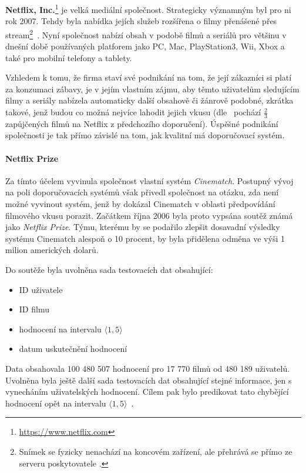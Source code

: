 \documentclass[thesis=M,czech]{FITthesis}[2014/05/07]
\begin{document}
\textbf{Netflix, Inc.}\footnote{\url{https://www.netflix.com}} je velká mediální společnost. Strategicky významným byl pro ni rok 2007. Tehdy byla nabídka jejích služeb rozšířena o filmy přenášené přes stream\footnote{Snímek se fyzicky nenachází na koncovém zařízení, ale přehrává se přímo ze serveru poskytovatele .}~\cite{netflix2007}. Nyní společnost nabízí obsah v podobě filmů a seriálů pro většinu v dnešní době používaných platforem jako PC, Mac, PlayStation3, Wii, Xbox a také pro mobilní telefony a tablety. 

Vzhledem k tomu, že firma staví své podnikání na tom, že její zákazníci si platí za konzumaci zábavy, je v jejím vlastním zájmu, aby těmto uživatelům sledujícím filmy a seriály nabízela automaticky další obsahově či žánrově podobné, zkrátka takové, jenž budou co možná nejvíce lahodit jejich vkusu (dle~\cite{netflixrec} pochází $\frac{2}{3}$ zapůjčených filmů na Netflix z předchozího doporučení). Úspěšné podnikání společnosti je tak přímo závislé na tom, jak kvalitní má doporučovací systém.

\paragraph{Netflix Prize}
Za tímto účelem vyvinula společnost vlastní systém \emph{Cinematch}. Postupný vývoj na poli doporučovacích systémů však přivedl společnost na otázku, zda není možné vyvinout systém, jenž by dokázal Cinematch v oblasti předpovídání filmového vkusu porazit. Začátkem října 2006 byla proto vypsána soutěž známá jako \emph{Netflix Prize}. Týmu, kterému by se podařilo zlepšit dosavadní výsledky systému Cinematch alespoň o 10 procent, by byla přidělena odměna ve výši 1 milion amerických dolarů.

Do soutěže byla uvolněna sada testovacích dat obsahující:

\begin{itemize}
	\item ID uživatele
	\item ID filmu
	\item hodnocení na intervalu $\langle1,5\rangle$
	\item datum uskutečnění hodnocení
\end{itemize}

Data obsahovala 100 480 507 hodnocení pro 17 770 filmů od 480 189 uživatelů. Uvolněna byla ještě další sada testovacích dat obsahující stejné informace, jen s vynecháním uživatelských hodnocení. Cílem pak bylo predikovat tato chybějící hodnocení opět na intervalu $\langle1,5\rangle$~\cite{netflixrules}.
\end{document}
